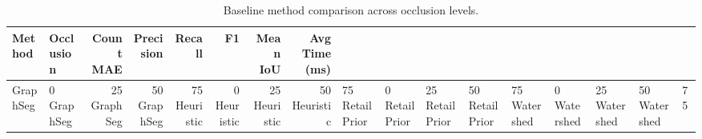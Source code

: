 \begin{table}
\caption{Baseline method comparison across occlusion levels.}
\label{tab:baseline_comparison}
\begin{tabular}{llrrrrrr}
\toprule
Method & Occlusion & Count MAE & Precision & Recall & F1 & Mean IoU & Avg Time (ms) \\
\midrule
GraphSeg & 0%
GraphSeg & 25%
GraphSeg & 50%
GraphSeg & 75%
Heuristic & 0%
Heuristic & 25%
Heuristic & 50%
Heuristic & 75%
RetailPrior & 0%
RetailPrior & 25%
RetailPrior & 50%
RetailPrior & 75%
Watershed & 0%
Watershed & 25%
Watershed & 50%
Watershed & 75%
\bottomrule
\end{tabular}
\end{table}
